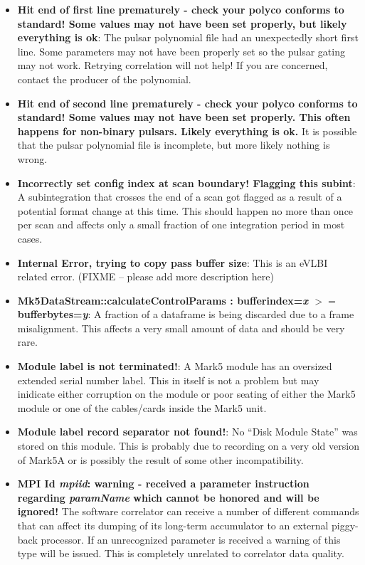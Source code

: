 \begin{itemize}
\item {\bf Hit end of first line prematurely - check your polyco conforms to standard! Some values may not have been set properly, but likely everything is ok}:
The pulsar polynomial file had an unexpectedly short first line.
Some parameters may not have been properly set so the pulsar gating may not work.
Retrying correlation will not help!
If you are concerned, contact the producer of the polynomial.

\item {\bf Hit end of second line prematurely - check your polyco conforms to standard! Some values may not have been set properly.  This often happens for non-binary pulsars.  Likely everything is ok.}
It is possible that the pulsar polynomial file is incomplete, but more likely nothing is wrong.

\item {\bf Incorrectly set config index at scan boundary! Flagging this subint}:
A subintegration that crosses the end of a scan got flagged as a result of a potential format change at this time.
This should happen no more than once per scan and affects only a small fraction of one integration period in most cases.

\item {\bf Internal Error, trying to copy pass buffer size}:
This is an eVLBI related error.  (FIXME -- please add more description here)

\item {\bf Mk5DataStream::calculateControlParams : bufferindex={\it x} $>=$ bufferbytes={\it y}}:
A fraction of a dataframe is being discarded due to a frame misalignment.
This affects a very small amount of data and should be very rare.

\item {\bf Module label is not terminated!}:
A Mark5 module has an oversized extended serial number label.
This in itself is not a problem but may inidicate either corruption on the module or poor seating of either the Mark5 module or one of the cables/cards inside the Mark5 unit.

\item {\bf Module label record separator not found!}:
No ``Disk Module State'' was stored on this module.
This is probably due to recording on a very old version of Mark5A or is possibly the result of some other incompatibility.

\item {\bf MPI Id {\it mpiid}: warning - received a parameter instruction regarding {\it paramName} which cannot be honored and will be ignored!}
The software correlator can receive a number of different commands that can affect its dumping of its long-term accumulator to an external piggy-back processor.
If an unrecognized parameter is received a warning of this type will be issued.
This is completely unrelated to correlator data quality.


\end{itemize}
